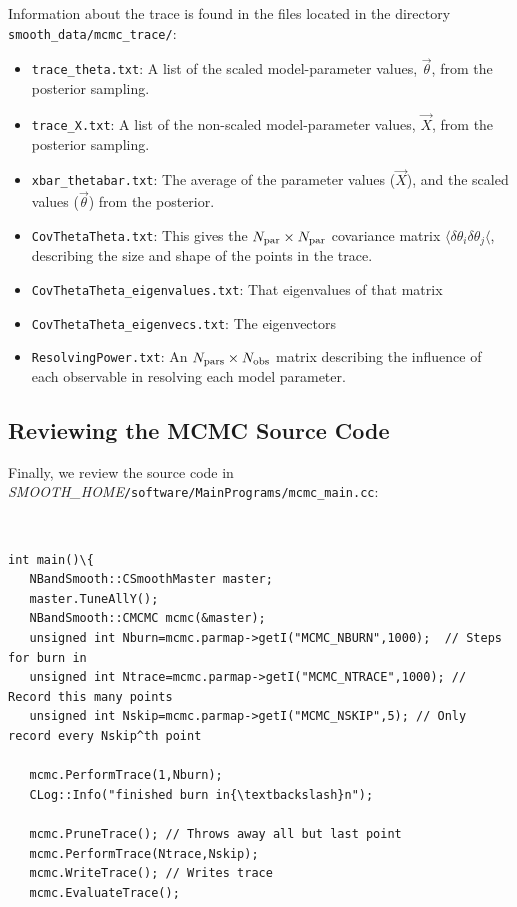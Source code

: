 \documentclass[UserManual.tex]{subfiles}
\begin{document}
\begin{sloppypar}
Information about the trace is found in the files located in the directory {\tt smooth\_data/mcmc\_trace/}:
\begin{itemize}
\item {\tt trace\_theta.txt}: A list of the scaled model-parameter values, $\vec{\theta}$, from the posterior sampling.
\item {\tt trace\_X.txt}: A list of the non-scaled model-parameter values, $\vec{X}$, from the posterior sampling.
\item {\tt xbar\_thetabar.txt}: The average of the parameter values ($\vec{X}$), and the scaled values ($\vec{\theta}$) from the posterior.
\item {\tt CovThetaTheta.txt}: This gives the $N_{\rm par}\times N_{\rm par}$ covariance matrix $\langle\delta \theta_i\delta\theta_j\langle$, describing the size and shape of the points in the trace.
\item {\tt CovThetaTheta\_eigenvalues.txt}: That eigenvalues of that matrix
\item {\tt CovThetaTheta\_eigenvecs.txt}: The eigenvectors
\item {\tt ResolvingPower.txt}: An $N_{\rm pars}\times N_{\rm obs}$ matrix describing the influence of each observable in resolving each model parameter.
\end{itemize}

\subsection{Reviewing the MCMC Source Code}\label{sec:mcmcsource}

Finally, we review the source code in \textit{SMOOTH\_HOME}{\tt /software/MainPrograms/mcmc\_main.cc}:
{\tt
\begin{Verbatim}[commandchars=\\\{\}]
int main()\{
   NBandSmooth::CSmoothMaster master;
   master.TuneAllY();
   NBandSmooth::CMCMC mcmc(&master);
   unsigned int Nburn=mcmc.parmap->getI("MCMC_NBURN",1000);  // Steps for burn in
   unsigned int Ntrace=mcmc.parmap->getI("MCMC_NTRACE",1000); // Record this many points
   unsigned int Nskip=mcmc.parmap->getI("MCMC_NSKIP",5); // Only record every Nskip^th point
      
   mcmc.PerformTrace(1,Nburn);   
   CLog::Info("finished burn in{\textbackslash}n");
   
   mcmc.PruneTrace(); // Throws away all but last point
   mcmc.PerformTrace(Ntrace,Nskip);
   mcmc.WriteTrace(); // Writes trace
   mcmc.EvaluateTrace();


\end{Verbatim}}
\end{sloppypar}
\end{document}
